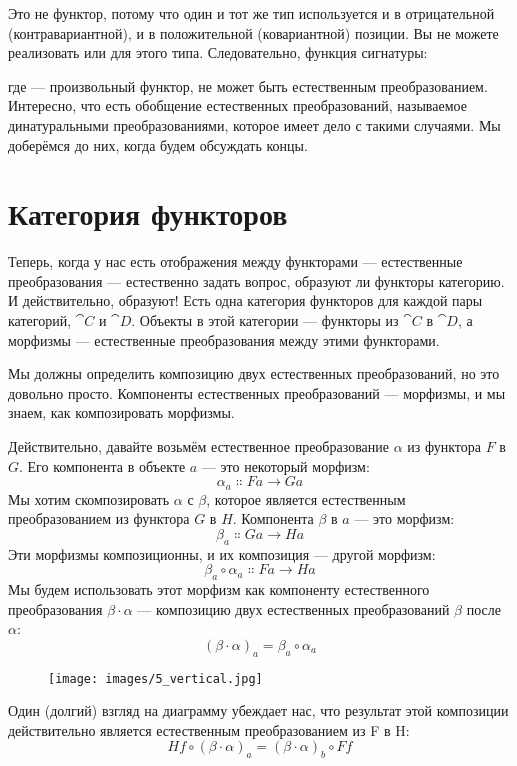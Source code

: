 Это не функтор, потому что один и тот же тип  используется и в
отрицательной (контравариантной), и в положительной (ковариантной) позиции. Вы
не можете реализовать  или  для этого типа.
Следовательно, функция сигнатуры:

где  --- произвольный функтор, не может быть естественным
преобразованием. Интересно, что есть обобщение естественных
преобразований, называемое динатуральными преобразованиями, которое имеет дело с такими
случаями. Мы доберёмся до них, когда будем обсуждать концы.

\section{Категория функторов}

Теперь, когда у нас есть отображения между функторами --- естественные преобразования
--- естественно задать вопрос, образуют ли функторы
категорию. И действительно, образуют! Есть одна категория функторов для каждой
пары категорий, $\cat{C}$ и $\cat{D}$. Объекты в этой категории --- функторы из
$\cat{C}$ в $\cat{D}$, а морфизмы --- естественные преобразования между этими
функторами.

Мы должны определить композицию двух естественных преобразований, но это
довольно просто. Компоненты естественных преобразований --- морфизмы, и
мы знаем, как композировать морфизмы.

Действительно, давайте возьмём естественное преобразование $\alpha$ из функтора $F$ в $G$. Его
компонента в объекте $a$ --- это некоторый морфизм:
\[\alpha_a \Colon F a \to G a\]
Мы хотим скомпозировать $\alpha$ с $\beta$, которое является естественным преобразованием из
функтора $G$ в $H$. Компонента $\beta$ в $a$ --- это морфизм:
\[\beta_a \Colon G a \to H a\]
Эти морфизмы композиционны, и их композиция --- другой
морфизм:
\[\beta_a \circ \alpha_a \Colon F a \to H a\]
Мы будем использовать этот морфизм как компоненту естественного преобразования
$\beta \cdot \alpha$ --- композицию двух естественных преобразований $\beta$ после $\alpha$:
\[(\beta \cdot \alpha)_a = \beta_a \circ \alpha_a\]

\begin{figure}[H]
  \centering
  \texttt{[image: images/5\_vertical.jpg]}
\end{figure}

\noindent
Один (долгий) взгляд на диаграмму убеждает нас, что результат этой
композиции действительно является естественным преобразованием из F в H:
\[H f \circ (\beta \cdot \alpha)_a = (\beta \cdot \alpha)_b \circ F f\]

